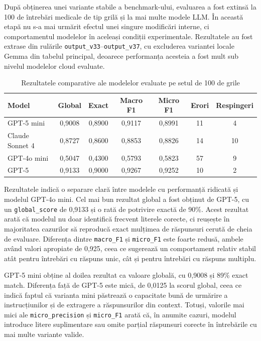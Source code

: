 \documentclass[12pt, a4paper, oneside, romanian]{teza-upb}
\begin{document}
După obținerea unei variante stabile a benchmark-ului, evaluarea a fost extinsă la 100 de întrebări medicale de tip grilă și la mai multe modele LLM. În această etapă nu s-a mai urmărit efectul unei singure modificări interne, ci comportamentul modelelor în aceleași condiții experimentale. Rezultatele au fost extrase din rulările \texttt{output\_v33}--\texttt{output\_v37}, cu excluderea variantei locale Gemma din tabelul principal, deoarece performanța acesteia a fost mult sub nivelul modelelor cloud evaluate.

\begin{table}[H]
\centering
\caption{Rezultatele comparative ale modelelor evaluate pe setul de 100 de grile}
\label{tab:rezultate_benchmark_llm}
\small
\setlength{\tabcolsep}{4pt}
\begin{tabular}{lcccccc}
\toprule
\textbf{Model} & \textbf{Global} & \textbf{Exact} & \textbf{Macro F1} & \textbf{Micro F1} & \textbf{Erori} & \textbf{Respingeri} \\
\midrule
GPT-5 mini & 0,9008 & 0,8900 & 0,9117 & 0,8991 & 11 & 4 \\
Claude Sonnet 4 & 0,8727 & 0,8600 & 0,8853 & 0,8826 & 14 & 10 \\
GPT-4o mini & 0,5047 & 0,4300 & 0,5793 & 0,5823 & 57 & 9 \\
GPT-5 & 0,9133 & 0,9000 & 0,9267 & 0,9252 & 10 & 2 \\
\bottomrule
\end{tabular}
\end{table}

Rezultatele indică o separare clară între modelele cu performanță ridicată și modelul GPT-4o mini. Cel mai bun rezultat global a fost obținut de GPT-5, cu un \texttt{global\_score} de 0,9133 și o rată de potrivire exactă de 90\%. Acest rezultat arată că modelul nu doar identifică frecvent literele corecte, ci reușește în majoritatea cazurilor să reproducă exact mulțimea de răspunsuri cerută de cheia de evaluare. Diferența dintre \texttt{macro\_F1} și \texttt{micro\_F1} este foarte redusă, ambele având valori apropiate de 0,925, ceea ce sugerează un comportament relativ stabil atât pentru întrebări cu răspuns unic, cât și pentru întrebări cu răspuns multiplu.

GPT-5 mini obține al doilea rezultat ca valoare globală, cu 0,9008 și 89\% exact match. Diferența față de GPT-5 este mică, de 0,0125 la scorul global, ceea ce indică faptul că varianta mini păstrează o capacitate bună de urmărire a instrucțiunilor și de extragere a răspunsurilor din context. Totuși, valorile mai mici ale \texttt{micro\_precision} și \texttt{micro\_F1} arată că, în anumite cazuri, modelul introduce litere suplimentare sau omite parțial răspunsuri corecte în întrebările cu mai multe variante valide.
\end{document}

